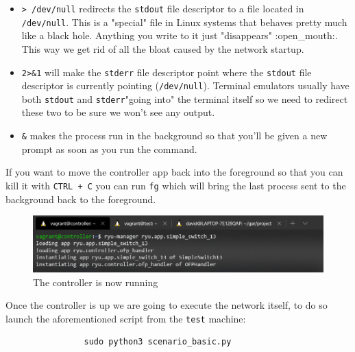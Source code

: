 \documentclass[12pt]{report}
\begin{document}
			\begin{itemize}
				\item \texttt{> /dev/null} redirects the \texttt{stdout} file descriptor to a file located in \texttt{/dev/null}. This is a "special" file in Linux systems that behaves pretty much like a black hole. Anything you write to it just "disappears" :open_mouth:. This way we get rid of all the bloat caused by the network startup.
				\item \texttt{2>&1} will make the \texttt{stderr} file descriptor point where the \texttt{stdout} file descriptor is currently pointing (\texttt{/dev/null}). Terminal emulators usually have both \texttt{stdout} and \texttt{stderr}"going into" the terminal itself so we need to redirect these two to be sure we won't see any output.
				\item \texttt{&} makes the process run in the background so that you'll be given a new prompt as soon as you run the command.
			\end{itemize}

			If you want to move the controller app back into the foreground so that you can kill it with \texttt{CTRL + C} you can run \texttt{fg} which will bring the last process sent to the background back to the foreground.

			\begin{figure}
				\centering
				\includegraphics[scale = 1]{controller_ex.png}
				\caption{The controller is now running}
			\end{figure}

			Once the controller is up we are going to execute the network itself, to do so launch the aforementioned script from the \texttt{test} machine:

			\begin{verbatim}
				sudo python3 scenario_basic.py
			\end{verbatim}
\end{document}
